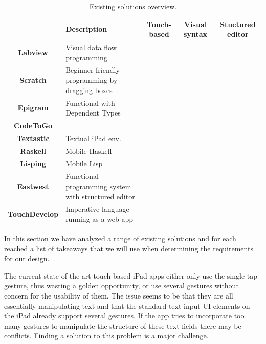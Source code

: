 \begin{table}[ht]
{\renewcommand{\arraystretch}{2}%
\begin{tabularx}{\textwidth{}}{|c|X|c|c|c|}
\hline
	& \textbf{Description}
	& \textbf{Touch-based}                                              
	& \textbf{Visual syntax}                          
	& \textbf{Stuctured editor} 
\\ \hline		
	\textbf{Labview}      & 
		Visual data flow programming & & \cellcolor[HTML]{38761D} &
\\ \hline
	\textbf{Scratch}      & 
		Beginner-friendly programming by dragging boxes
		  & & \cellcolor[HTML]{274E13} & \cellcolor[HTML]{274E13}
\\ \hline
	\textbf{Epigram}      & 
		Functional with Dependent Types & & \cellcolor[HTML]{6AA84F} &
\\ \hline
	\textbf{CodeToGo} & & \cellcolor[HTML]{B6D7A8}{\color[HTML]{9AFF99} }                  & & \\ \cline{1-1}
	\textbf{Textastic}  & \multirow{-2}{*}{
	Textual iPad env.
	} & \multirow{-2}{*}{\cellcolor[HTML]{B6D7A8}{\color[HTML]{9AFF99} }} & \multirow{-2}{*}{}                              & \multirow{-2}{*}{}                                                   
\\ \hline
	\textbf{Raskell}      & 
		Mobile Haskell & \cellcolor[HTML]{B6D7A8}{\color[HTML]{9AFF99} } & &                                                               
\\ \hline
	\textbf{Lisping}      & 
		Mobile Lisp & \cellcolor[HTML]{6AA84F} & & \cellcolor[HTML]{B6D7A8}

\\ \hline
	\textbf{Eastwest}     & 
		Functional programming system with structured editor
		 & & & \cellcolor[HTML]{274E13}
\\ \hline	
	\textbf{TouchDevelop} & 
		Imperative language running as a web app
		 & \cellcolor[HTML]{6AA84F} & & \cellcolor[HTML]{B6D7A8} 
\\ \hline
\end{tabularx}
}
\caption{Existing solutions overview.}
\label{table:existing_solutions_overview}
\end{table}
In this section we have analyzed a range of existing solutions and for each reached a list of takeaways that we will use when determining the requirements for our design.

The current state of the art touch-based iPad apps either only use the single tap gesture, thus wasting a golden opportunity, or use several gestures without concern for the usability of them. 
The issue seems to be that they are all essentially manipulating text and that the standard text input UI elements on the iPad already support several gestures. 
If the app tries to incorporate too many gestures to manipulate the structure of these text fields there may be conflicts. 
Finding a solution to this problem is a major challenge.

